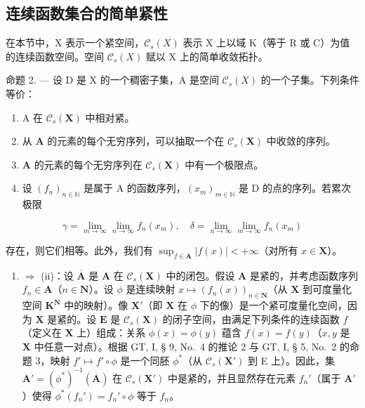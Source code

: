 \subsection{连续函数集合的简单紧性}

在本节中，X 表示一个紧空间，\(\mathcal{C}_{s}(X)\) 表示 X 上以域 K（等于 R 或 C）为值的连续函数空间。空间 \(\mathcal{C}_{s}(X)\) 赋以 X 上的简单收敛拓扑。

命题 2. --- 设 D 是 X 的一个稠密子集，A 是空间 \(\mathcal{C}_{s}(X)\) 的一个子集。下列条件等价：

\begin{enumerate}
\def\labelenumi{(\roman{enumi})}
\item
  A 在 \(\mathcal{C}_s(\mathbf{X})\) 中相对紧。
\item
  从 \(\mathbf{A}\) 的元素的每个无穷序列，可以抽取一个在 \(\mathcal{C}_s(\mathbf{X})\) 中收敛的序列。
\item
  \(\mathbf{A}\) 的元素的每个无穷序列在 \(\mathcal{C}_s(\mathbf{X})\) 中有一个极限点。
\item
  设 \((f_n)_{n\in \mathbb{N}}\) 是属于 A 的函数序列，\((x_m)_{m\in \mathbb{N}}\) 是 D 的点的序列。若累次极限
\end{enumerate}

\[
\gamma = \lim _ {m \rightarrow \infty} \lim _ {n \rightarrow \infty} f _ {n} (x _ {m}), \quad \delta = \lim _ {n \rightarrow \infty} \lim _ {m \rightarrow \infty} f _ {n} (x _ {m})
\]

存在，则它们相等。此外，我们有 \(\sup_{f\in \mathbf{A}}|f(x)| < +\infty\)（对所有 \(x\in \mathbf{X}\)）。

\begin{enumerate}
\def\labelenumi{(\roman{enumi})}
\tightlist
\item
  \(\Rightarrow\) (ii)：设 \(\overline{\mathbf{A}}\) 是 \(\mathbf{A}\) 在 \(\mathcal{C}_s(\mathbf{X})\) 中的闭包。假设 \(\mathbf{A}\) 是紧的，并考虑函数序列 \(f_n \in \mathbf{A}\)（\(n \in \mathbf{N}\)）。设 \(\phi\) 是连续映射 \(x \mapsto (f_n(x))_{n \in \mathbf{N}}\)（从 \(\mathbf{X}\) 到可度量化空间 \(\mathbf{K}^{\mathbf{N}}\) 中的映射）。像 \(\mathbf{X}'\)（即 \(\mathbf{X}\) 在 \(\phi\) 下的像）是一个紧可度量化空间，因为 \(\mathbf{X}\) 是紧的。设 \(\mathbf{E}\) 是 \(\mathcal{C}_s(\mathbf{X})\) 的闭子空间，由满足下列条件的连续函数 \(f\)（定义在 \(\mathbf{X}\) 上）组成：关系 \(\phi(x) = \phi(y)\) 蕴含 \(f(x) = f(y)\)（\(x, y\) 是 \(\mathbf{X}\) 中任意一对点）。根据 GT, I, § 9, No.~4 的推论 2 与 GT, I, § 5, No.~2 的命题 3，映射 \(f' \mapsto f' \circ \phi\) 是一个同胚 \(\phi^*\)（从 \(\mathcal{C}_s(\mathbf{X}')\) 到 E 上）。因此，集 \(\mathbf{A}' = (\phi^*)^{-1}(\overline{\mathbf{A}})\) 在 \(\mathcal{C}_s(\mathbf{X}')\) 中是紧的，并且显然存在元素 \(f_n'\)（属于 \(\mathbf{A}'\)）使得 \(\phi^*(f_n') = f_n' \circ \phi\) 等于 \(f_n\)。
\end{enumerate}

